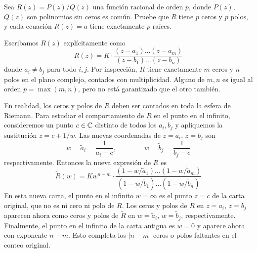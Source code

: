 \begin{exercise}
Sea $R(z) = P(z) / Q(z)$ una función racional de orden $p$, donde $P(z)$, $Q(z)$ son polinomios sin ceros es común. Pruebe que $R$ tiene $p$ ceros y $p$ polos, y cada ecuación $R(z) = a$ tiene exactamente $p$ raíces.
\end{exercise}

\begin{solution}
Escribamos $R(z)$ explícitamente como
$$R(z) = K \cdot \frac {(z - a_1) \dots (z - a_m)} {(z - b_1) \dots (z - b_n)}$$
donde $a_i \ne b_j$ para todo $i, j$. Por inspección, $R$ tiene exactamente $m$ ceros y $n$ polos en el plano complejo, contados con multiplicidad. Alguno de $m, n$ es igual al orden $p = \max(m, n)$, pero no está garantizado que el otro también.

En realidad, los ceros y polos de $R$ deben ser contados en toda la esfera de Riemann. Para estudiar el comportamiento de $R$ en el punto en el infinito, consideremos un punto $c \in \mathbb C$ distinto de todos los $a_i, b_j$ y apliquemos la sustitución $z = c + 1/w$. Las nuevas coordenadas de $z = a_i$, $z = b_j$ son
$$w = \tilde a_i = \frac 1 {a_i - c}, \qquad \qquad w = \tilde b_j = \frac 1 {b_j - c}$$
respectivamente. Entonces la nueva expresión de $R$ es
$$
\tilde R(w) = Kw^{n-m} \cdot \frac
    {(1 - w / \tilde a_1) \dots (1 - w / \tilde a_m)}
    {(1 - w / \tilde b_1) \dots (1 - w / \tilde b_n)}
$$
En esta nueva carta, el punto en el infinito $w = \infty$ es el punto $z = c$ de la carta original, que no es ni cero ni polo de $R$. Los ceros y polos de $R$ en $z = a_i$, $z = b_j$ aparecen ahora como ceros y polos de $\tilde R$ en $w = \tilde a_i$, $w = \tilde b_j$, respectivamente. Finalmente, el punto en el infinito de la carta antigua es $w = 0$ y aparece ahora con exponente $n-m$. Esto completa los $|n-m|$ ceros o polos faltantes en el conteo original.
\end{solution}
